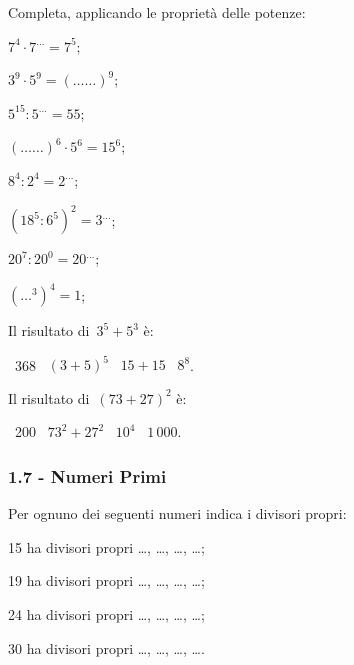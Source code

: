 \pagebreak
\begin{esercizio}
\label{ese:1.12}
 Completa, applicando le proprietà delle potenze:
\begin{multicols}{3}
 \begin{enumeratea}
 \item $7^4\cdot7^{\ldots}=7^5$;
 \item $3^9\cdot5^9=(\ldots\ldots)^9$;
 \item $5^{15}:5^{\ldots}=55$;
 \item $(\ldots\ldots)^6\cdot5^6=15^6$;
 \item $8^4:2^4=2^{\ldots}$;
 \item $\left(18^5:6^5\right)^2=3^{\ldots}$;
 \item $20^7:20^0=20^{\ldots}$;
 \item $\left(\ldots^3\right)^4=1$;
 \end{enumeratea}
\end{multicols}
\end{esercizio}

\begin{esercizio}
\label{ese:1.13}
 Il risultato di~$3^5+5^3$ è:
 \begin{center}
 \boxA\:~368 \quad\boxB\:~$(3+5)^5$ \quad\boxC\:~$15+15$ \quad\boxD\:~$8^8$.
 \end{center}
\end{esercizio}

\begin{esercizio}
\label{ese:1.14}
 Il risultato di~$(73+27)^2$ è:
 \begin{center}
 \boxA\:~200 \quad\boxB\:~$73^2+27^2$ \quad\boxC\:~$10^4$ \quad\boxD\:~$1\,000$.
 \end{center}
\end{esercizio}

\subsubsection*{1.7 - Numeri Primi}
\begin{esercizio}
\label{ese:1.15}
 Per ognuno dei seguenti numeri indica i divisori propri:
 \begin{enumeratea}
 \item 15 ha divisori propri \ldots, \ldots, \ldots, \ldots;
 \item 19 ha divisori propri \ldots, \ldots, \ldots, \ldots;
 \item 24 ha divisori propri \ldots, \ldots, \ldots, \ldots;
 \item 30 ha divisori propri \ldots, \ldots, \ldots, \ldots.
 \end{enumeratea}
\end{esercizio}


